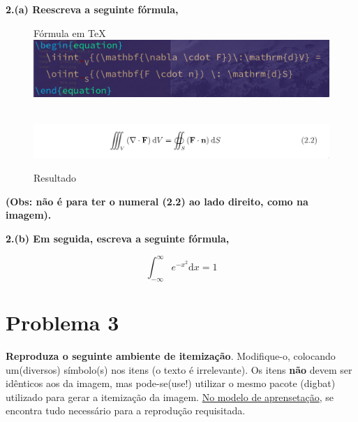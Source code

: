 \documentclass[a4paper,11pt]{abntex2}
\theoremstyle{mytheor}
\begin{document}
\textbf{2.(a) Reescreva a seguinte fórmula,}

\begin{figure}[!htb]
  \begin{center}
    \caption{\label{fig:ForLatex} } Fórmula em \TeX \\

    \includegraphics[scale=0.5]{./imagens/A2I71.png}\\

  \end{center}
\end{figure}

\begin{figure}[!htb]
  \begin{center}
    \caption{\label{fig:mapa} Resultado}\\

    \includegraphics[scale=0.5]{./imagens/A2I72.png}\\

  \end{center}
\end{figure}

\textcolor{red!70!black}{\textbf{(Obs: não é para ter o numeral (2.2) ao lado direito, como na imagem).}}

\vspace{0.5cm}
{\noident\textbf{2.(b) Em seguida, escreva a seguinte fórmula,}}

\begin{equation}
  \int_{- \infty}^{\infty}{e^{-x^2} \mathrm{d}x}=1
\end{equation}

\clearpage

\section*{Problema 3}

\textbf{Reproduza o seguinte ambiente de itemização}. Modifique-o,
colocando um(diversos)
símbolo(s) nos itens (o texto é irrelevante). Os itens  \textbf{não}
devem ser idênticos aos da imagem, mas pode-se(use!) utilizar o mesmo pacote
(digbat) utilizado para gerar a itemização da imagem. \href{https://github.com/26-55-87-BuddhiLW/MC-LaTeX/tree/master/Exemplos/ArquivosCurso/ModApresent}{No
  modelo de aprensetação}, se encontra tudo necessário para a
reprodução requisitada.
\end{document}
